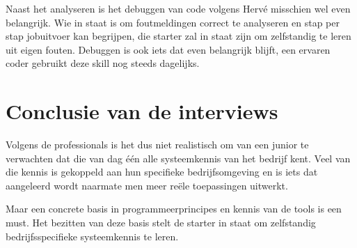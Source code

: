 Naast het analyseren is het debuggen van code volgens Hervé misschien wel even belangrijk.
Wie in staat is om foutmeldingen correct te analyseren en stap per stap jobuitvoer kan begrijpen, die starter zal in staat zijn om zelfstandig te leren uit eigen fouten.
Debuggen is ook iets dat even belangrijk blijft, een ervaren coder gebruikt deze skill nog steeds dagelijks.


\section{Conclusie van de interviews}%
\label{sec:Conclusie-van-de-interviews}

Volgens de professionals is het dus niet realistisch om van een junior te verwachten dat die van dag één alle systeemkennis van het bedrijf kent.
Veel van die kennis is gekoppeld aan hun specifieke bedrijfsomgeving en is iets dat aangeleerd wordt naarmate men meer reële toepassingen uitwerkt.

Maar een concrete basis in programmeerprincipes en kennis van de tools is een must.
Het bezitten van deze basis stelt de starter in staat om zelfstandig bedrijfsspecifieke systeemkennis te leren.